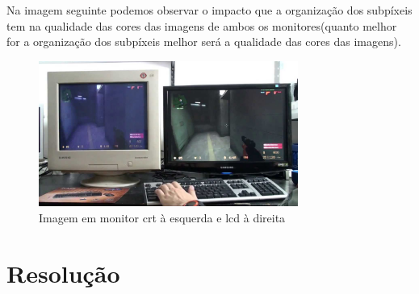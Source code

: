 \documentclass[a4paper]{report}
\begin{document}
Na imagem seguinte podemos observar o impacto que a organização dos subpíxeis tem na qualidade das cores das imagens de ambos os monitores(quanto melhor for a organização dos subpíxeis melhor será a qualidade das cores das imagens).
\begin{center}
\begin{figure}[H]
\center
\includegraphics[width=8.5cm]{imagens/comp.jpg}
\caption{Imagem em monitor \ac{crt} à esquerda e \ac{lcd} à direita}
\end{figure}
\end{center}

\chapter{Resolução}
\label{chap.Resolução}
\end{document}
